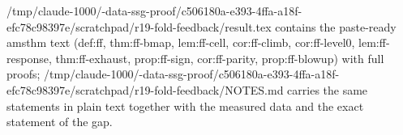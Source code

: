 /tmp/claude-1000/-data-ssg-proof/c506180a-e393-4ffa-a18f-efc78c98397e/scratchpad/r19-fold-feedback/result.tex contains the paste-ready amsthm text (def:ff, thm:ff-bmap, lem:ff-cell, cor:ff-climb, cor:ff-level0, lem:ff-response, thm:ff-exhaust, prop:ff-sign, cor:ff-parity, prop:ff-blowup) with full proofs; /tmp/claude-1000/-data-ssg-proof/c506180a-e393-4ffa-a18f-efc78c98397e/scratchpad/r19-fold-feedback/NOTES.md carries the same statements in plain text together with the measured data and the exact statement of the gap.